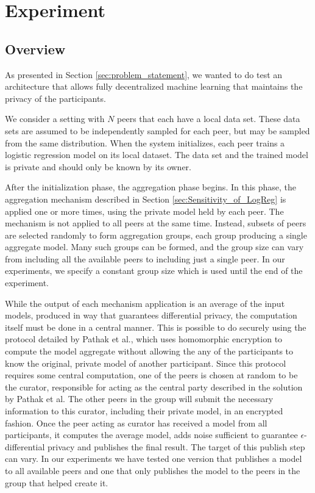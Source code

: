 
\chapter{Experiment}

\section{Overview}
\label{sec:experiment_overview}
As presented in Section \ref{sec:problem_statement}, we wanted to do test an architecture that allows fully decentralized machine learning that maintains the privacy of the participants. 

We consider a setting with $N$ peers that each have a local data set. These data sets are assumed to be independently sampled for each peer, but may be sampled from the same distribution. When the system initializes, each peer trains a logistic regression model on its local dataset. The data set and the trained model is private and should only be known by its owner.

After the initialization phase, the aggregation phase begins. In this phase, the aggregation mechanism described in Section \ref{sec:Sensitivity_of_LogReg} is applied one or more times, using the private model held by each peer. The mechanism is not applied to all peers at the same time. Instead, subsets of peers are selected randomly to form aggregation groups, each group producing a single aggregate model. Many such groups can be formed, and the group size can vary from including all the available peers to including just a single peer. In our experiments, we specify a constant group size which is used until the end of the experiment.

While the output of each mechanism application is an average of the input models, produced in way that guarantees differential privacy, the computation itself must be done in a central manner. This is possible to do securely using the protocol detailed by Pathak et al., which uses homomorphic encryption to compute the model aggregate without allowing the any of the participants to know the original, private model of another participant\cite{pathak2010diffprivhomo}. Since this protocol requires some central computation, one of the peers is chosen at random to be the curator, responsible for acting as the central party described in the solution by Pathak et al. The other peers in the group will submit the necessary information to this curator, including their private model, in an encrypted fashion. Once the peer acting as curator has received a model from all participants, it computes the average model, adds noise sufficient to guarantee $\epsilon$-differential privacy and publishes the final result. The target of this publish step can vary. In our experiments we have tested one version that publishes a model to all available peers and one that only publishes the model to the peers in the group that helped create it.

